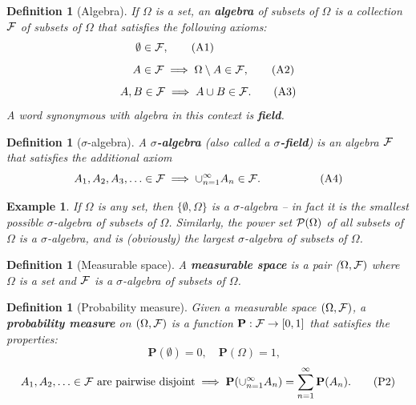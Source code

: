 \documentclass[12pt]{article}
\newtheorem{defi}[thm]{Definition}
\newcommand{\prob}{\mathbf{P}}
\theoremstyle{example}
\newtheorem{example}[thm]{Example}
\begin{document}
\begin{defi}[Algebra] If $\Omega$ is a set, an \textbf{algebra} of subsets of $\Omega$ is a collection ${\cal F}$ of subsets of $\Omega$ that satisfies the following axioms:
\begin{equation}
\emptyset \in {\cal F},  \tag{A1}\qquad\qquad\qquad
\end{equation}
\begin{equation}
\ \ \ A \in {\cal F} \implies \Omega\setminus A \in {\cal F}, \tag{A2} \\
\end{equation}
\begin{equation}
A,B \in {\cal F} \implies A\cup B \in {\cal F}.  \tag{A3}
\end{equation}
A word synonymous with algebra in this context is \textbf{field}.
\end{defi}

\begin{defi}[$\sigma$-algebra] A \textbf{$\sigma$-algebra} (also called a \textbf{$\sigma$-field}) is an algebra ${\cal F}$ that satisfies the additional axiom
\begin{equation}
A_1, A_2, A_3, \ldots \in {\cal F} \implies \cup_{n=1}^\infty A_n \in {\cal F}.
\ \ \ \ \ \ \ \ \ \ 
\tag{A4}
\end{equation}
\end{defi}

\begin{example} If $\Omega$ is any set, then $\{ \emptyset, \Omega \}$ is a $\sigma$-algebra -- in fact it is the smallest possible $\sigma$-algebra of subsets of $\Omega$. Similarly, the power set ${\cal P}(\Omega)$ of all subsets of $\Omega$ is a $\sigma$-algebra, and is (obviously) the largest $\sigma$-algebra of subsets of $\Omega$.
\end{example}

\begin{defi}[Measurable space] A \textbf{measurable space} is a pair ($\Omega,{\cal F})$ where $\Omega$ is a set and ${\cal F}$ is a $\sigma$-algebra of subsets of $\Omega$.
\end{defi}

\begin{defi}[Probability measure] Given a measurable space $(\Omega, {\cal F})$, a \textbf{probability measure} on $(\Omega, {\cal F})$ is a function $\prob:{\cal F}\to[0,1]$ that satisfies the properties:
\begin{equation}
\ \ \ \ \ \prob(\emptyset) = 0, \quad \prob(\Omega) = 1,
\tag{P1}
\end{equation}
\begin{equation}
A_1, A_2, \ldots \in {\cal F}\textrm{ are pairwise disjoint} \implies
\prob(\cup_{n=1}^\infty A_n) = \sum_{n=1}^\infty \prob(A_n).
\tag{P2}
\end{equation}
\end{defi}
\end{document}
